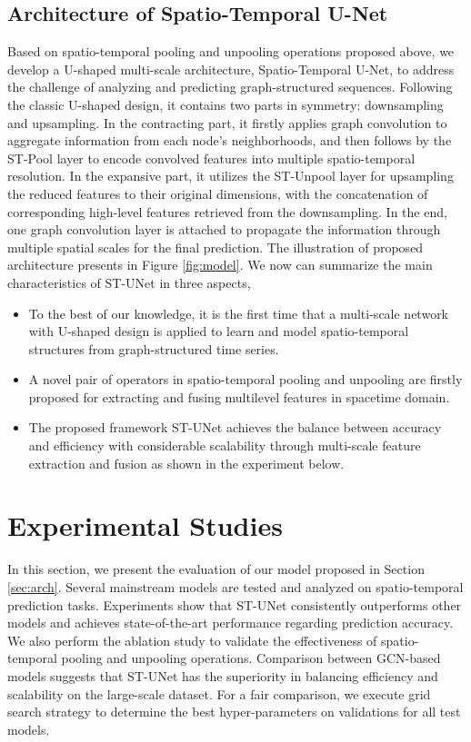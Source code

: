 \documentclass[sigconf,screen]{acmart}
\begin{document}
\subsection{\label{sec:arch}Architecture of Spatio-Temporal U-Net}
Based on spatio-temporal pooling and unpooling operations proposed above, we develop a U-shaped multi-scale architecture, Spatio-Temporal U-Net, to address the challenge of analyzing and predicting graph-structured sequences. Following the classic U-shaped design, it contains two parts in symmetry: downsampling and upsampling. In the contracting part, it firstly applies graph convolution to aggregate information from each node's neighborhoods, and then follows by the ST-Pool layer to encode convolved features into multiple spatio-temporal resolution. In the expansive part, it utilizes the ST-Unpool layer for upsampling the reduced features to their original dimensions, with the concatenation of corresponding high-level features retrieved from the downsampling. In the end, one graph convolution layer is attached to propagate the information through multiple spatial scales for the final prediction. The illustration of proposed architecture presents in Figure \ref{fig:model}. We now can summarize the main characteristics of ST-UNet in three aspects,
\begin{itemize}
  \item To the best of our knowledge, it is the first time that a multi-scale network with U-shaped design is applied to learn and model spatio-temporal structures from graph-structured time series.
  \item A novel pair of operators in spatio-temporal pooling and unpooling are firstly proposed for extracting and fusing multilevel features in spacetime domain.
  \item The proposed framework ST-UNet achieves the balance between accuracy and efficiency with considerable scalability through multi-scale feature extraction and fusion as shown in the experiment below.
\end{itemize}


\section{Experimental Studies}
In this section, we present the evaluation of our model proposed in Section \ref{sec:arch}. Several mainstream models are tested and analyzed on spatio-temporal prediction tasks. Experiments show that ST-UNet consistently outperforms other models and achieves state-of-the-art performance regarding prediction accuracy. We also perform the ablation study to validate the effectiveness of spatio-temporal pooling and unpooling operations. Comparison between GCN-based models suggests that ST-UNet has the superiority in balancing efficiency and scalability on the large-scale dataset. For a fair comparison, we execute grid search strategy to determine the best hyper-parameters on validations for all test models.
\end{document}
